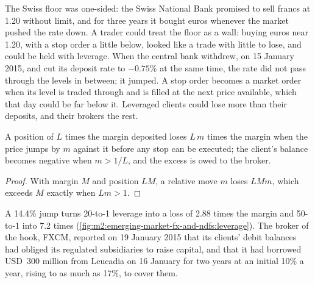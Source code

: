 The Swiss floor was one-sided: the Swiss National Bank promised to sell francs
at 1.20 without limit, and for three years it bought euros whenever the market
pushed the rate down. A trader could treat the floor as a wall: buying euros
near 1.20, with a stop order a little below, looked like a trade with little to
lose, and could be held with leverage. When the central bank withdrew, on 15
January 2015, and cut its deposit rate to $-0.75\%$ at the same time, the rate
did not pass through the levels in between; it jumped. A stop order becomes a
market order when its level is traded through and is filled at the next price
available, which that day could be far below it. Leveraged clients could lose
more than their deposits, and their brokers the rest.

\begin{proposition}\label{prop:m2:emerging-market-fx-and-ndfs:leverage}
A position of $L$ times the margin deposited loses $L\,m$ times the margin when
the price jumps by $m$ against it before any stop can be executed; the client's
balance becomes negative when $m > 1/L$, and the excess is owed to the broker.
\end{proposition}

\begin{proof}
With margin $M$ and position $LM$, a relative move $m$ loses $LMm$, which exceeds
$M$ exactly when $Lm > 1$.
\end{proof}

A 14.4\% jump turns 20-to-1 leverage into a loss of 2.88 times the margin and
50-to-1 into 7.2 times (\cref{fig:m2:emerging-market-fx-and-ndfs:leverage}). The
broker of the hook, FXCM, reported on 19 January 2015 that its clients' debit
balances had obliged its regulated subsidiaries to raise capital, and that it
had borrowed USD~300 million from Leucadia on 16 January for two years at an
initial 10\% a year, rising to as much as 17\%, to cover them.

